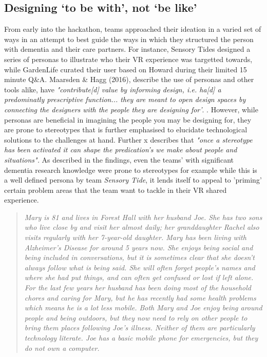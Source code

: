 \subsection{Designing `to be with', not `be like'}
\label{sec:considerationbeWith}
From early into the hackathon, teams approached their ideation in a varied set of ways in an attempt to best guide the ways in which they structured the person with dementia and their care partners. For instance, Sensory Tides designed a series of personas to illustrate who their VR experience was targetted towards, while GardenLife curated their user based on Howard during their limited 15 minute Q\&A. Maarsden \& Hagg (2016), describe the use of personas and other tools alike, have \textit{"contribute[d] value by informing design, i.e. ha[d] a predominatly prescriptive function... they are meant to open design spaces by connecting the designers with the people they are designing for'}. \citep{marsden_stereotypes_2016}. However, while personas are beneficial in imagining the people you may be designing for, they are prone to stereotypes that is further emphasised to elucidate technological solutions to the challenges at hand. Further x describes that \textit{"once a stereotype has been activated it can shape the predication's we make about people and situations".} As described in the findings, even the teams' with significant dementia research knowledge were prone to stereotypes for example while this is a well defined persona by team \textit{Sensory Tide}, it lends itself to appeal to 'priming' certain problem areas that the team want to tackle in their VR shared experience.
\begin{quote}
\textit{Mary is 81 and lives in Forest Hall with her husband Joe. She has two sons who live close by and visit her almost daily; her granddaughter Rachel also visits regularly with her 7-year-old daughter. Mary has been living with Alzheimer’s Disease for around 5 years now. She enjoys being social and being included in conversations, but it is sometimes clear that she doesn’t always follow what is being said. She will often forget people’s names and where she had put things, and can often get confused or lost if left alone. For the last few years her husband has been doing most of the household chores and caring for Mary, but he has recently had some health problems which means he is a lot less mobile. Both Mary and Joe enjoy being around people and being outdoors, but they now need to rely on other people to bring them places following Joe’s illness. Neither of them are particularly technology literate. Joe has a basic mobile phone for emergencies, but they do not own a computer. }
\end{quote}

